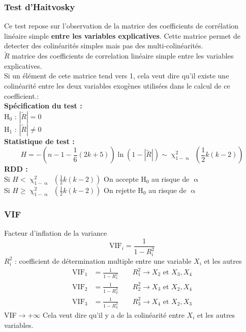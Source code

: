 \documentclass{article}
\begin{document}
\subsubsection{Test d'Haitvosky}
Ce test repose sur l'observation de la matrice des coefficients de corrélation linéaire simple
\textbf{entre les variables explicatives}. Cette matrice permet de detecter des colinéarités
simples mais pas des multi-colinéarités.\\
 $\tilde{R}$ matrice des coefficients de correlation linéaire simple entre les variables
    explicatives. \\
Si un élément de cete matrice tend vers 1, cela veut dire qu'il existe une colinéarité entre les deux variables exogènes utilisées dans le calcul de ce coefficient.: \\
\textbf{Spécification du test :} \\
H$_0$ : $|\tilde{R}| = 0$  \\
H$_1$ : $|\tilde{R}|\neq 0$ \\
\textbf{Statistique de test :}
\begin{equation*}
	H = - \left(n-1-\frac{1}{6}(2k +5)\right)\ln\left(1-|\tilde{R}|\right) \sim \upchi^2_{1-\upalpha} \; \left(\frac{1}{2}k(k-2)\right)
\end{equation*}
\textbf{RDD :}\\
Si $H< \upchi^2_{1-\upalpha} \; \left(\frac{1}{2}k(k-2)\right)$ On accepte H$_0$ au risque de $\upalpha$ \\
Si $H\ge  \upchi^2_{1-\upalpha} \; \left(\frac{1}{2}k(k-2)\right)$ On rejette H$_0$ au risque de $\upalpha$ \\

\subsubsection{VIF}
Facteur d'inflation de la variance
\begin{equation*}
    \text{VIF}_i = \frac{1}{1-R_i^2}
\end{equation*}
$R_i^2$ : coefficient de détermination multiple entre une variable $X_i$ et les autres
\begin{equation*}
    \begin{split}
        \text{VIF}_1 &= \frac{1}{1-R_1^2} \qquad R_1^2 \rightarrow X_2 \text{ et } X_3,X_4 \\
        \text{VIF}_2 &= \frac{1}{1-R_2^2} \qquad R_2^2 \rightarrow X_3 \text{ et } X_2,X_4 \\
        \text{VIF}_3 &= \frac{1}{1-R_3^2} \qquad R_3^2 \rightarrow X_4 \text{ et } X_2,X_3 
    \end{split}
\end{equation*}
VIF$\rightarrow + \infty$ Cela veut dire qu'il y a de la colinéarité entre $X_i$ et les
autres variables.
\end{document}
